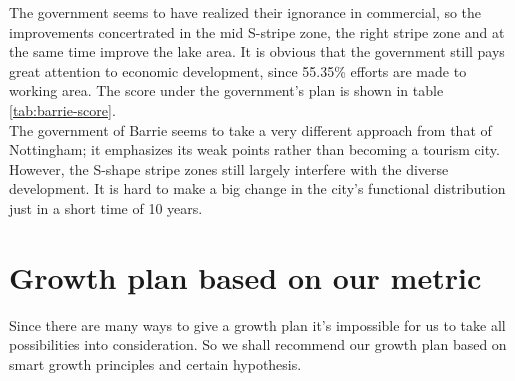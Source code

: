 The government seems to have realized their ignorance in commercial, so the improvements concertrated in the mid S-stripe zone, the right stripe zone and at the same time improve the lake area.
It is obvious that the government still pays great attention to economic development, since 55.35\% efforts are made to working area.
The score under the government's plan is shown in table \ref{tab:barrie-score}.
\\
The government of Barrie seems to take a very different approach from that of Nottingham; it emphasizes its weak points rather than becoming a tourism city.
However, the S-shape stripe zones still largely interfere with the diverse development.
It is hard to make a big change in the city's functional distribution just in a short time of 10 years.


\section{Growth plan based on our metric}
Since there are many ways to give a growth plan it's impossible for us to take all possibilities into consideration.
So we shall recommend our growth plan based on smart growth principles and certain hypothesis.
